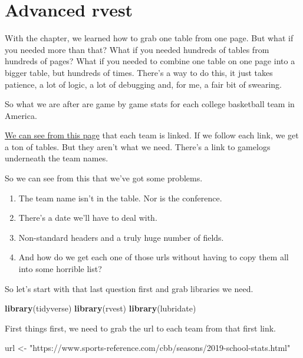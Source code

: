 \documentclass[
]{book}
\newenvironment{Shaded}{\begin{snugshade}}{\end{snugshade}}
\newcommand{\KeywordTok}[1]{\textcolor[rgb]{0.13,0.29,0.53}{\textbf{#1}}}
\newcommand{\NormalTok}[1]{#1}
\newcommand{\StringTok}[1]{\textcolor[rgb]{0.31,0.60,0.02}{#1}}
\providecommand{\tightlist}{%
  \setlength{\itemsep}{0pt}\setlength{\parskip}{0pt}}
\begin{document}
\hypertarget{advanced-rvest}{%
\chapter{Advanced rvest}\label{advanced-rvest}}

With the chapter, we learned how to grab one table from one page. But what if you needed more than that? What if you needed hundreds of tables from hundreds of pages? What if you needed to combine one table on one page into a bigger table, but hundreds of times. There's a way to do this, it just takes patience, a lot of logic, a lot of debugging and, for me, a fair bit of swearing.

So what we are after are game by game stats for each college basketball team in America.

\href{https://www.sports-reference.com/cbb/seasons/2019-school-stats.html}{We can see from this page} that each team is linked. If we follow each link, we get a ton of tables. But they aren't what we need. There's a link to gamelogs underneath the team names.

So we can see from this that we've got some problems.

\begin{enumerate}
\def\labelenumi{\arabic{enumi}.}
\tightlist
\item
  The team name isn't in the table. Nor is the conference.
\item
  There's a date we'll have to deal with.
\item
  Non-standard headers and a truly huge number of fields.
\item
  And how do we get each one of those urls without having to copy them all into some horrible list?
\end{enumerate}

So let's start with that last question first and grab libraries we need.

\begin{Shaded}
\begin{Highlighting}[]
\KeywordTok{library}\NormalTok{(tidyverse)}
\KeywordTok{library}\NormalTok{(rvest)}
\KeywordTok{library}\NormalTok{(lubridate)}
\end{Highlighting}
\end{Shaded}

First things first, we need to grab the url to each team from that first link.

\begin{Shaded}
\begin{Highlighting}[]
\NormalTok{url <-}\StringTok{ "https://www.sports-reference.com/cbb/seasons/2019-school-stats.html"}
\end{Highlighting}
\end{Shaded}
\end{document}
